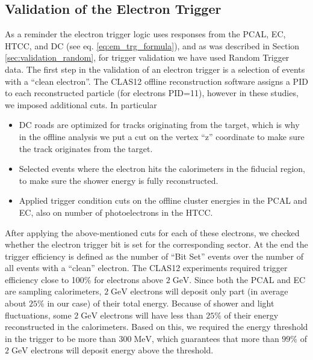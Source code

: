 \subsection{Validation of the Electron Trigger}
\label{elctron_trigger_validation}
As a reminder the electron trigger logic uses responses from the PCAL, EC, HTCC, and DC (see eq. \ref{eq:em_trg_formula}), and as was described in Section \ref{sec:validation_random}, for trigger validation we have used Random Trigger data. 
The first step in the validation of an electron trigger is a selection of  events with a ``clean electron''. The CLAS12 offline reconstruction software assigns a PID to each reconstructed particle \cite{offline-ref} (for electrons PID=11), however in these studies, we imposed additional cuts. 
In particular 
\begin{itemize}
 \item DC roads are optimized for tracks originating from the target, which is why in the offline analysis we put a cut on the vertex ``z'' coordinate to make sure the track originates from the target.
 \item Selected events where the electron hits the calorimeters in the fiducial region, to make sure the shower energy is fully reconstructed.
 \item Applied trigger condition cuts on the offline cluster energies in the PCAL and EC, also on number of photoelectrons in the HTCC.
\end{itemize}
After applying the above-mentioned cuts for each of these electrons, we checked whether the electron trigger bit is set for the corresponding sector. At the end the trigger efficiency is defined as the number of ``Bit  Set'' events over the number of all events with a ``clean'' electron.
The CLAS12 experiments required trigger efficiency close to 100\% for electrons above $\mathrm{2\;GeV}$. Since both the PCAL and EC are sampling calorimeters, $\mathrm{2\;GeV}$ electrons will deposit only part (in average about $25\%$ in our case) of their total energy. Because of shower and light fluctuations, some $\mathrm{2\;GeV}$ electrons will have less than $\mathrm{25\%}$ of their energy reconstructed in the calorimeters. Based on this, we required the energy threshold in the trigger to be more than $\mathrm{300 \; MeV}$, which guarantees that more than $\mathrm{99\%}$ of $\mathrm{2\;GeV}$ electrons will deposit energy above the threshold.

